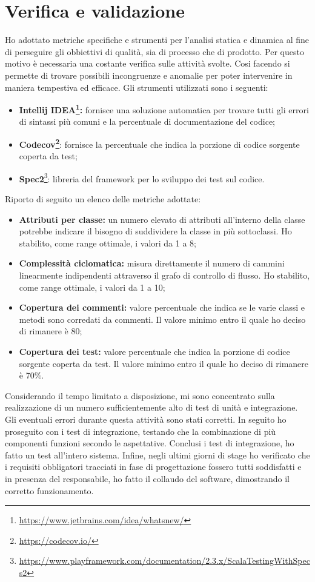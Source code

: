 \section{Verifica e validazione}\label{metriche}
Ho adottato metriche specifiche e strumenti per l'analisi statica e dinamica al fine di perseguire gli obbiettivi di qualità, sia di processo che di prodotto. Per questo motivo è necessaria una costante verifica sulle attività svolte. Cosi facendo si permette di trovare possibili incongruenze e anomalie per poter intervenire in maniera tempestiva ed efficace.
Gli strumenti utilizzati sono i seguenti:
\begin{itemize}
	\item \textbf{Intellij IDEA\footnote{\url{https://www.jetbrains.com/idea/whatsnew/}}: }fornisce una soluzione automatica per trovare tutti gli errori di sintassi più comuni e la percentuale di documentazione del codice;
	\item \textbf{Codecov\footnote{\url{https://codecov.io/}}}: fornisce la percentuale che indica la porzione di codice sorgente coperta da test;
	\item \textbf{Spec2}\footnote{\url{https://www.playframework.com/documentation/2.3.x/ScalaTestingWithSpecs2}}: libreria del framework per lo sviluppo dei test sul codice.
\end{itemize}
Riporto di seguito un elenco delle metriche adottate:
\begin{itemize}
	\item \textbf{Attributi per classe:} un numero elevato di attributi all'interno della classe potrebbe indicare il bisogno di suddividere la classe in più sottoclassi. Ho stabilito, come range ottimale, i valori da 1 a 8;
	\item \textbf{Complessità ciclomatica:} misura direttamente il numero di cammini linearmente indipendenti attraverso il grafo di controllo di flusso. Ho stabilito, come range ottimale, i valori da 1 a 10;
	\item \textbf{Copertura dei commenti:} valore percentuale che indica se le varie classi e metodi sono corredati da commenti. Il valore minimo entro il quale ho deciso di rimanere è 80;
	\item \textbf{Copertura dei test:} valore percentuale che indica la porzione di codice sorgente coperta da test. Il valore minimo entro il quale ho deciso di rimanere è 70\%.
\end{itemize}
Considerando il tempo limitato a disposizione, mi sono concentrato sulla realizzazione di un numero sufficientemente alto di test di unità e integrazione.\\
Gli eventuali errori durante questa attività sono stati corretti. In seguito ho proseguito con i test di integrazione, testando che la combinazione di più componenti funzioni secondo le aspettative. Conclusi i test di integrazione, ho fatto un test all'intero sistema. Infine, negli ultimi giorni di stage ho verificato che i requisiti obbligatori tracciati in fase di progettazione fossero tutti soddisfatti e in presenza del responsabile, ho fatto il collaudo del software, dimostrando il corretto funzionamento.\\

